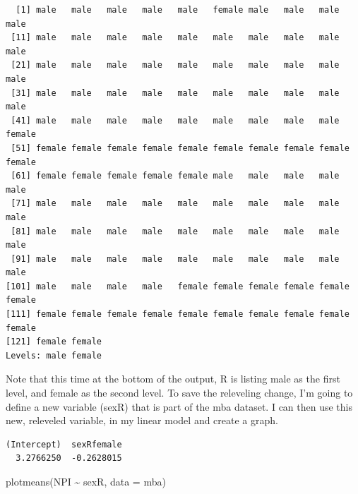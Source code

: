 \documentclass[
  letterpaper,
  DIV=11,
  numbers=noendperiod,
  oneside]{scrreprt}
\newenvironment{Shaded}{\begin{snugshade}}{\end{snugshade}}
\newcommand{\AttributeTok}[1]{\textcolor[rgb]{0.40,0.45,0.13}{#1}}
\newcommand{\CommentTok}[1]{\textcolor[rgb]{0.37,0.37,0.37}{#1}}
\newcommand{\FunctionTok}[1]{\textcolor[rgb]{0.28,0.35,0.67}{#1}}
\newcommand{\NormalTok}[1]{\textcolor[rgb]{0.00,0.23,0.31}{#1}}
\newcommand{\OtherTok}[1]{\textcolor[rgb]{0.00,0.23,0.31}{#1}}
\newcommand{\SpecialCharTok}[1]{\textcolor[rgb]{0.37,0.37,0.37}{#1}}
\newcommand{\StringTok}[1]{\textcolor[rgb]{0.13,0.47,0.30}{#1}}
\begin{document}
\begin{verbatim}
  [1] male   male   male   male   male   female male   male   male   male  
 [11] male   male   male   male   male   male   male   male   male   male  
 [21] male   male   male   male   male   male   male   male   male   male  
 [31] male   male   male   male   male   male   male   male   male   male  
 [41] male   male   male   male   male   male   male   male   male   female
 [51] female female female female female female female female female female
 [61] female female female female female male   male   male   male   male  
 [71] male   male   male   male   male   male   male   male   male   male  
 [81] male   male   male   male   male   male   male   male   male   male  
 [91] male   male   male   male   male   male   male   male   male   male  
[101] male   male   male   male   female female female female female female
[111] female female female female female female female female female female
[121] female female
Levels: male female
\end{verbatim}

Note that this time at the bottom of the output, R is listing male as
the first level, and female as the second level. To save the releveling
change, I'm going to define a new variable (sexR) that is part of the
mba dataset. I can then use this new, releveled variable, in my linear
model and create a graph.

\begin{Shaded}
\end{Shaded}

\begin{verbatim}
(Intercept)  sexRfemale 
  3.2766250  -0.2628015 
\end{verbatim}

\begin{Shaded}
\begin{Highlighting}[]
\FunctionTok{plotmeans}\NormalTok{(NPI }\SpecialCharTok{\textasciitilde{}}\NormalTok{ sexR, }\AttributeTok{data =}\NormalTok{ mba)}
\end{Highlighting}
\end{Shaded}
\end{document}
